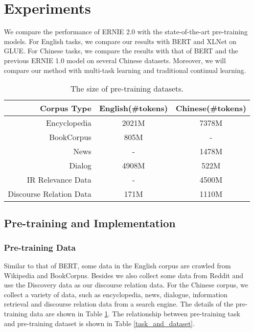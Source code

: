 \documentclass[letterpaper]{article} \usepackage{aaai20}  \usepackage{times}  \usepackage{helvet} \usepackage{courier}  \usepackage[hyphens]{url}  \usepackage{graphicx} \usepackage{makecell}
\begin{document}
\section{Experiments}
We compare the performance of ERNIE 2.0 with the state-of-the-art pre-training models. For English tasks, we compare our results with BERT \cite{devlin2018bert} and XLNet \cite{yang2019xlnet} on GLUE. For Chinese tasks, we compare the results with that of BERT \cite{devlin2018bert} and the previous ERNIE 1.0 \cite{sun2019ernie} model on several Chinese datasets. Moreover, we will compare  our method with multi-task learning and traditional continual learning.
\begin{table}[htpb]
\centering
\small
\begin{center}
{
\begin{tabular}{@{}rcc@{}}
  \hline
  \hline
  Corpus Type     & English(\#tokens) & Chinese(\#tokens) \\ \hline
  Encyclopedia & 2021M & 7378M  \\ 
  BookCorpus  & 805M &  - \\ 
  News  & - &  1478M \\ \
  Dialog  & 4908M & 522M  \\ 
  IR Relevance Data & - & 4500M \\
  Discourse Relation Data & 171M & 1110M \\
\hline
\hline
\end{tabular}
} \end{center}
\caption{The size of pre-training datasets. }
\label{training_dataset}
\end{table}
\subsection{Pre-training and Implementation}
\subsubsection{Pre-training Data}
Similar to that of BERT, some data in the English corpus are crawled from Wikipedia and BookCorpus. Besides we also collect some data from Reddit and use the Discovery data \cite{sileo2019mining} as our discourse relation data. For the Chinese corpus, we collect a variety of data, such as encyclopedia, news, dialogue, information retrieval and discourse relation data from a search engine.
The details of the pre-training data are shown in Table \ref{training_dataset}. The relationship between pre-training task and pre-training dataset is shown in Table \ref{task_and_dataset}.
\end{document}
